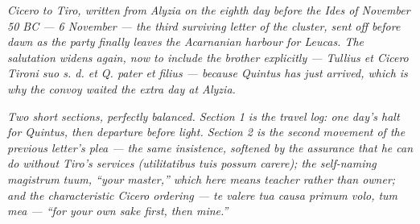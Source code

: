 
\textit{Cicero to Tiro, written from Alyzia on the eighth
day before the Ides of November 50 BC --- 6 November ---
the third surviving letter of the cluster, sent off before
dawn as the party finally leaves the Acarnanian harbour
for Leucas. The salutation widens again, now to include
the brother explicitly --- \textit{Tullius et Cicero
Tironi suo s. d. et Q. pater et filius} --- because
Quintus has just arrived, which is why the convoy waited
the extra day at Alyzia.}

\textit{Two short sections, perfectly balanced. Section 1
is the travel log: one day's halt for Quintus, then
departure before light. Section 2 is the second movement
of the previous letter's plea --- the same insistence,
softened by the assurance that he can do without Tiro's
services (\textit{utilitatibus tuis possum carere}); the
self-naming \textit{magistrum tuum}, ``your master,''
which here means teacher rather than owner; and the
characteristic Cicero ordering --- \textit{te valere tua
causa primum volo, tum mea} --- ``for your own sake first,
then mine.''}
